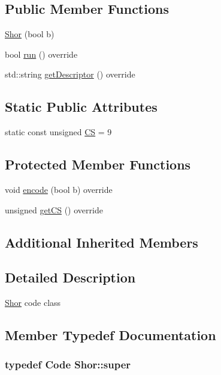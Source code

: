 \subsection*{Public Member Functions}
\begin{DoxyCompactItemize}
\item 
\hyperlink{class_shor_ac7cca820563c3eb81c28a8fc736249b6}{Shor} (bool b)
\item 
bool \hyperlink{class_shor_abe454e38fed6f33d832c3d7fd64627ea}{run} () override
\item 
std\+::string \hyperlink{class_shor_ad9a43efd28edf5df378d0c6b7dfbb051}{get\+Descriptor} () override
\end{DoxyCompactItemize}
\subsection*{Static Public Attributes}
\begin{DoxyCompactItemize}
\item 
static const unsigned \hyperlink{class_shor_a5c2bb5ad73004577f8781a001eda8b8f}{CS} = 9
\end{DoxyCompactItemize}
\subsection*{Protected Member Functions}
\begin{DoxyCompactItemize}
\item 
void \hyperlink{class_shor_a77db4d99076a0e581057faae8071574c}{encode} (bool b) override
\item 
unsigned \hyperlink{class_shor_a5cfb32ea0c6f73fd9478ce93b7fafb4f}{get\+CS} () override
\end{DoxyCompactItemize}
\subsection*{Additional Inherited Members}


\subsection{Detailed Description}
\hyperlink{class_shor}{Shor} code class 

\subsection{Member Typedef Documentation}
\subsubsection[{\texorpdfstring{super}{super}}]{\setlength{\rightskip}{0pt plus 5cm}typedef {\bf Code} {\bf Shor\+::super}}\hypertarget{class_shor_a7ea95c357f9d816b3a37176aa4e01781}{}\label{class_shor_a7ea95c357f9d816b3a37176aa4e01781}


